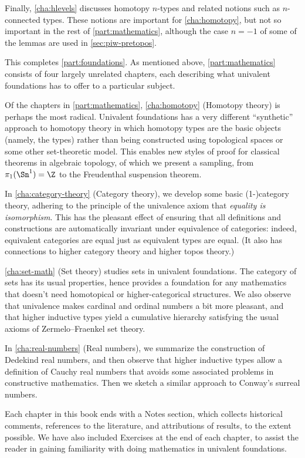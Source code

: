 Finally, \cref{cha:hlevels} discusses homotopy $n$-types and related notions such as $n$-connected types.
These notions are important for \cref{cha:homotopy}, but not so important in the rest of \cref{part:mathematics}, although the case $n=-1$ of some of the lemmas are used in \cref{sec:piw-pretopos}.

This completes \cref{part:foundations}.
As mentioned above, \cref{part:mathematics} consists of four largely unrelated chapters, each describing what univalent foundations has to offer to a particular subject.

Of the chapters in \cref{part:mathematics}, \cref{cha:homotopy} (Homotopy theory) is perhaps the most radical.
Univalent foundations has a very different ``synthetic'' approach to homotopy theory in which homotopy types are the basic objects (namely, the types) rather than being constructed using topological spaces or some other set-theoretic model.
This enables new styles of proof for classical theorems in algebraic topology, of which we present a sampling, from $\pi_1(\Sn^1)=\Z$ to the Freudenthal suspension theorem.

In \cref{cha:category-theory} (Category theory), we develop some basic (1-)category theory, adhering to the principle of the univalence axiom that \emph{equality is isomorphism}.
This has the pleasant effect of ensuring that all definitions and constructions are automatically invariant under equivalence of categories: indeed, equivalent categories are equal just as equivalent types are equal.
(It also has connections to higher category theory and higher topos theory.)

\cref{cha:set-math} (Set theory) studies sets in univalent foundations.
The category of sets has its usual properties, hence provides a foundation for any mathematics that doesn't need homotopical or higher-categorical structures.
We also observe that univalence makes cardinal and ordinal numbers a bit more pleasant, and that higher inductive types yield a cumulative hierarchy satisfying the usual axioms of Zermelo--Fraenkel set theory.

In \cref{cha:real-numbers} (Real numbers), we summarize the construction of Dedekind real numbers, and then observe that higher inductive types allow a definition of Cauchy real numbers that avoids some associated problems in constructive mathematics.
Then we sketch a similar approach to Conway's surreal numbers.

Each chapter in this book ends with a Notes section, which collects historical comments, references to the literature, and attributions of results, to the extent possible.
We have also included Exercises at the end of each chapter, to assist the reader in gaining familiarity with doing mathematics in univalent foundations.

